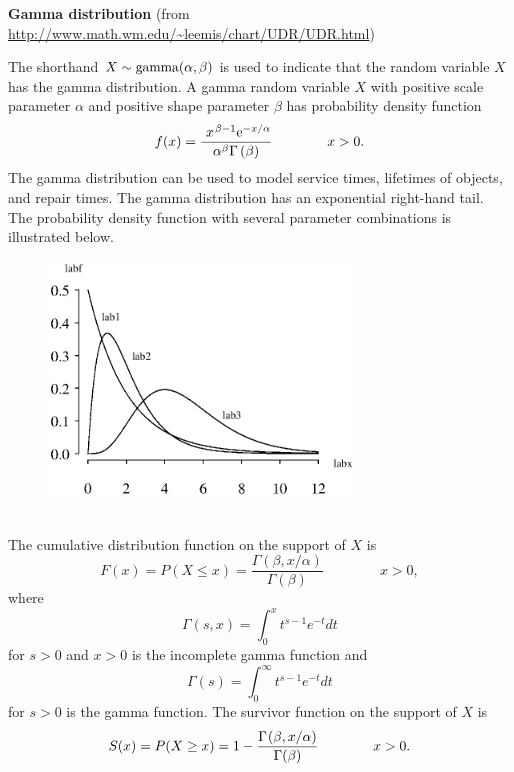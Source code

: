 \documentclass[12pt,fullpage]{article}
\begin{document}
\noindent
{\bf Gamma distribution} (from \color{blue}\url{http://www.math.wm.edu/~leemis/chart/UDR/UDR.html}\color{black})

\noindent
The shorthand $X \sim {\rm gamma}(\alpha,\beta)$ is used to indicate that the
random variable $X$ has the gamma distribution.
A gamma random variable $X$ with positive scale parameter $\alpha$ and
positive shape parameter $\beta$ has probability density function 
$$
f(x) = {\frac {{\it }\, {\it }\, x  ^ {\kern 0.08 em \beta - 1}{{\rm e} ^ {-x / \alpha}}}
{\alpha ^ {\beta} \Gamma  \left( {\it \beta} \right) }}
\qquad \qquad x > 0.
$$
The gamma distribution can be used to model service times, lifetimes of objects, and repair times.
The gamma distribution has an exponential right-hand tail.
The probability density function with several parameter combinations is illustrated below.
{\begin{figure}[h!]
\begin{center}
\includegraphics[width=3.2in]{GammaPlot.ps}
\end{center}
\end{figure}}\\
The cumulative distribution function on the support of $X$ is
$$
F(x) = P(X \le x) = \frac{\Gamma(\beta, x/\alpha)}{\Gamma(\beta)} \qquad \qquad x > 0,
$$
where
$$
\Gamma(s,x) = \int_{0} ^ {x} t ^ {s - 1} e ^ {-t} dt
$$
for $s > 0$ and $x > 0$ is the incomplete gamma function and 
$$
\Gamma(s) = \int_{0} ^ {\infty} t ^ {s - 1} e ^ {-t} dt
$$
for $s > 0$ is the gamma function.
The survivor function on the support of $X$ is
$$
S(x) = P(X \ge x) =1- \frac{\Gamma \kern 0.08 em (\beta, x/\alpha)}{\Gamma (\beta)} \qquad \qquad x > 0.
$$
\end{document}
